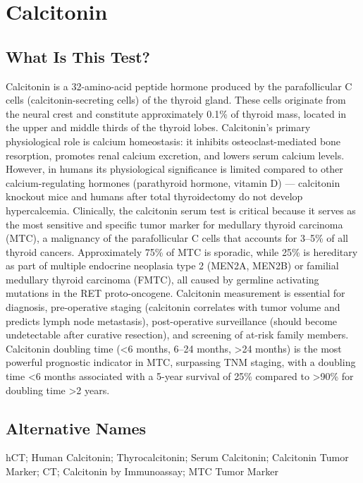 \chapter{Calcitonin}

\section*{What Is This Test?}
Calcitonin is a 32-amino-acid peptide hormone produced by the parafollicular C cells (calcitonin-secreting cells) of the thyroid gland. These cells originate from the neural crest and constitute approximately 0.1\% of thyroid mass, located in the upper and middle thirds of the thyroid lobes. Calcitonin's primary physiological role is calcium homeostasis: it inhibits osteoclast-mediated bone resorption, promotes renal calcium excretion, and lowers serum calcium levels. However, in humans its physiological significance is limited compared to other calcium-regulating hormones (parathyroid hormone, vitamin D) --- calcitonin knockout mice and humans after total thyroidectomy do not develop hypercalcemia. Clinically, the calcitonin serum test is critical because it serves as the most sensitive and specific tumor marker for medullary thyroid carcinoma (MTC), a malignancy of the parafollicular C cells that accounts for 3--5\% of all thyroid cancers. Approximately 75\% of MTC is sporadic, while 25\% is hereditary as part of multiple endocrine neoplasia type 2 (MEN2A, MEN2B) or familial medullary thyroid carcinoma (FMTC), all caused by germline activating mutations in the RET proto-oncogene. Calcitonin measurement is essential for diagnosis, pre-operative staging (calcitonin correlates with tumor volume and predicts lymph node metastasis), post-operative surveillance (should become undetectable after curative resection), and screening of at-risk family members. Calcitonin doubling time (<6 months, 6--24 months, >24 months) is the most powerful prognostic indicator in MTC, surpassing TNM staging, with a doubling time <6 months associated with a 5-year survival of 25\% compared to >90\% for doubling time >2 years.

\section*{Alternative Names}
hCT; Human Calcitonin; Thyrocalcitonin; Serum Calcitonin; Calcitonin Tumor Marker; CT; Calcitonin by Immunoassay; MTC Tumor Marker

